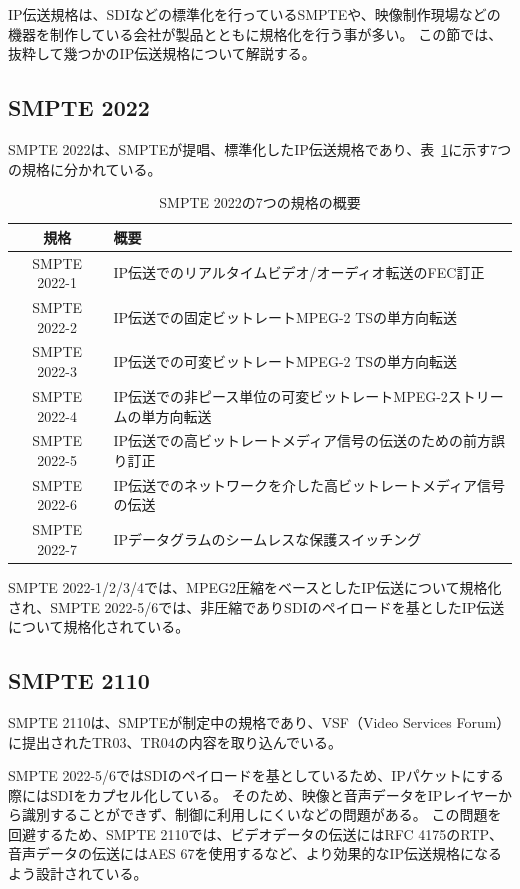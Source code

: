 IP伝送規格は、SDIなどの標準化を行っているSMPTEや、映像制作現場などの機器を制作している会社が製品とともに規格化を行う事が多い。
この節では、抜粋して幾つかのIP伝送規格について解説する。

\subsection{SMPTE 2022}
SMPTE 2022は、SMPTEが提唱、標準化したIP伝送規格であり、表~\ref{tb:smpte2022-abstract}に示す7つの規格に分かれている。

\begin{table}[htbp]
  \caption{SMPTE 2022の7つの規格の概要}
  \label{tb:smpte2022-abstract}
  \begin{center}
  \begin{tabular}{c|l}
    \hline
    規格          & 概要 \\\hline\hline
    SMPTE 2022-1 & IP伝送でのリアルタイムビデオ/オーディオ転送のFEC訂正 \\\hline
    SMPTE 2022-2 & IP伝送での固定ビットレートMPEG-2 TSの単方向転送 \\\hline
    SMPTE 2022-3 & IP伝送での可変ビットレートMPEG-2 TSの単方向転送 \\\hline
    SMPTE 2022-4 & IP伝送での非ピース単位の可変ビットレートMPEG-2ストリームの単方向転送 \\\hline
    SMPTE 2022-5 & IP伝送での高ビットレートメディア信号の伝送のための前方誤り訂正 \\\hline
    SMPTE 2022-6 & IP伝送でのネットワークを介した高ビットレートメディア信号の伝送 \\\hline
    SMPTE 2022-7 & IPデータグラムのシームレスな保護スイッチング \\\hline
  \end{tabular}\end{center}
\end{table}

SMPTE 2022-1/2/3/4では、MPEG2圧縮をベースとしたIP伝送について規格化され、SMPTE 2022-5/6では、非圧縮でありSDIのペイロードを基としたIP伝送について規格化されている。

\subsection{SMPTE 2110}
SMPTE 2110は、SMPTEが制定中の規格であり、VSF（Video Services Forum）に提出されたTR03、TR04の内容を取り込んでいる。

SMPTE 2022-5/6ではSDIのペイロードを基としているため、IPパケットにする際にはSDIをカプセル化している。
そのため、映像と音声データをIPレイヤーから識別することができず、制御に利用しにくいなどの問題がある。
この問題を回避するため、SMPTE 2110では、ビデオデータの伝送にはRFC 4175\cite{rfc4175}のRTP、音声データの伝送にはAES 67を使用するなど、より効果的なIP伝送規格になるよう設計されている。

